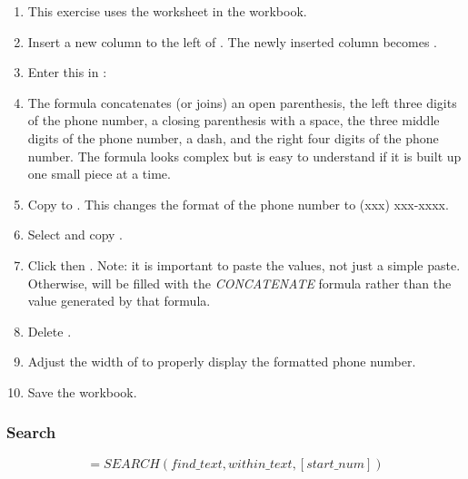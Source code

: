 \begin{enumerate}
	\item This exercise uses the  worksheet in the  workbook.
	\item Insert a new column to the left of . The newly inserted column becomes .
	\item Enter this in : 
	\item The formula concatenates (or joins) an open parenthesis, the left three digits of the phone number, a closing parenthesis with a space, the three middle digits of the phone number, a dash, and the right four digits of the phone number. The formula looks complex but is easy to understand if it is built up one small piece at a time.
	\item Copy  to . This changes the format of the phone number to (xxx) xxx-xxxx.
	\item Select and copy .
	\item Click  then . Note: it is important to paste the values, not just a simple paste. Otherwise,  will be filled with the \textit{CONCATENATE} formula rather than the value generated by that formula.
	\item Delete .
	\item Adjust the width of  to properly display the formatted phone number.
	\item Save the  workbook.
\end{enumerate}

\subsubsection{Search}	

\[ =SEARCH(find\_text, within\_text, [start\_num]) \]


